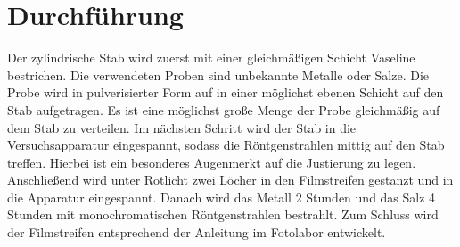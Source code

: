 \section{Durchführung}
\label{sec:Durchführung}
Der zylindrische Stab wird zuerst mit einer gleichmäßigen Schicht Vaseline bestrichen.
 Die verwendeten Proben sind unbekannte Metalle oder Salze. Die Probe wird in pulverisierter
  Form auf in einer möglichst ebenen Schicht auf den Stab aufgetragen. Es ist eine möglichst
   große Menge der Probe gleichmäßig auf dem Stab zu verteilen. Im nächsten Schritt
    wird der Stab in die Versuchsapparatur eingespannt, sodass die Röntgenstrahlen
     mittig auf den Stab treffen. Hierbei ist ein besonderes Augenmerkt auf die Justierung zu legen.
      Anschließend wird unter Rotlicht zwei Löcher in den Filmstreifen gestanzt und in die Apparatur eingespannt.
       Danach wird das Metall 2 Stunden und das Salz 4 Stunden mit monochromatischen Röntgenstrahlen bestrahlt.
       Zum Schluss wird der Filmstreifen entsprechend der Anleitung im Fotolabor entwickelt.
